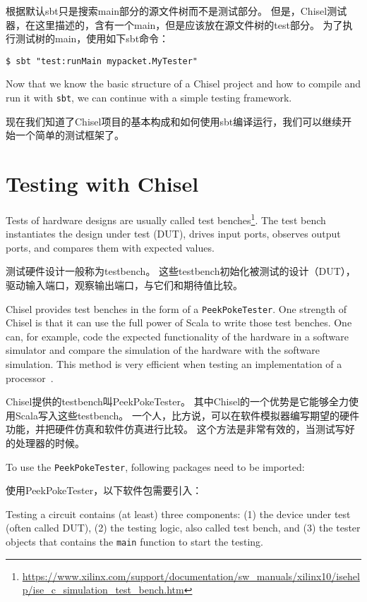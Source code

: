 \documentclass[%
    10pt,
    headinclude, footexclude,
    openright, %
    notitlepage,
    cleardoubleempty,
    headsepline,
    pointlessnumbers,
    bibtotoc, idxtotoc,
    ]{scrbook}
\newcommand{\code}[1]{{\small{\texttt{#1}}}}
\newcommand{\myref}[2]{\href{#1}{#2}}
\renewcommand{\myref}[2]{{#2}{\footnote{\url{#1}}}}
\begin{document}
根据默认sbt只是搜索main部分的源文件树而不是测试部分。
但是，Chisel测试器，在这里描述的，含有一个main，但是应该放在源文件树的test部分。
为了执行测试树的main，使用如下sbt命令：

\begin{verbatim}
$ sbt "test:runMain mypacket.MyTester"
\end{verbatim}

Now that we know the basic structure of a Chisel project and how to compile and run it
with \code{sbt}, we can continue with a simple testing framework.

现在我们知道了Chisel项目的基本构成和如何使用sbt编译运行，我们可以继续开始一个简单的测试框架了。
    
\section{Testing with Chisel}

Tests of hardware designs are usually called \myref{https://www.xilinx.com/support/documentation/sw_manuals/xilinx10/isehelp/ise_c_simulation_test_bench.htm}{test benches}.
The test bench instantiates the design under test (DUT), drives input ports, observes output ports,
and compares them with expected values.

测试硬件设计一般称为testbench。
这些testbench初始化被测试的设计（DUT），驱动输入端口，观察输出端口，与它们和期待值比较。

Chisel provides test benches in the form of a \code{PeekPokeTester}.
One strength of Chisel is that it can use the full power of Scala to write those
test benches. One can, for example, code the expected functionality of the hardware
in a software simulator and compare the simulation of the hardware with the
software simulation. This method is very efficient when testing an implementation
of a processor~\cite{lipsi:arcs2018}.

Chisel提供的testbench叫PeekPokeTester。
其中Chisel的一个优势是它能够全力使用Scala写入这些testbench。
一个人，比方说，可以在软件模拟器编写期望的硬件功能，并把硬件仿真和软件仿真进行比较。
这个方法是非常有效的，当测试写好的处理器的时候。

To use the \code{PeekPokeTester}, following packages need to be imported:

使用PeekPokeTester，以下软件包需要引入：


\noindent Testing a circuit contains (at least) three components: (1) the device under test (often
called DUT), (2) the testing logic, also called test bench, and (3) the tester objects
that contains the \code{main} function to start the testing.
\end{document}
